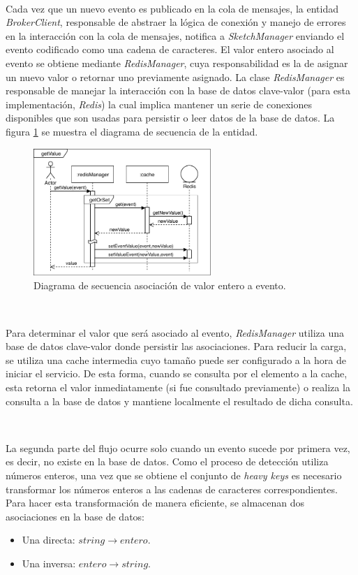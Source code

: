 \documentclass[a4paper,12pt, oneside]{article}
\begin{document}
\

Cada vez que un nuevo evento es publicado en la cola de mensajes, la entidad \textit{BrokerClient}, responsable de abstraer la lógica de conexión y manejo de errores en la interacción con la cola de mensajes, notifica a \textit{SketchManager} enviando el evento codificado como una cadena de caracteres. El valor entero asociado al evento se obtiene mediante \textit{RedisManager}, cuya responsabilidad es la de asignar un nuevo valor o retornar uno previamente asignado. La clase \textit{RedisManager} es responsable de manejar la interacción con la base de datos clave-valor (para esta implementación, \textit{Redis}) la cual implica mantener un serie de conexiones disponibles que son usadas para persistir o leer datos de la base de datos. La figura \ref{diag:redis_manager} se muestra el diagrama de secuencia de la entidad.

\begin{figure}[hb]
	\centering
	\includegraphics[width=0.6\textwidth]{./graph/SecDiag-redisManagerGetValue.pdf}
	\caption{Diagrama de secuencia asociación de valor entero a evento.}
	\label{diag:redis_manager}
\end{figure}

\

Para determinar el valor que será asociado al evento, \textit{RedisManager} utiliza una base de datos clave-valor donde persistir las asociaciones. Para reducir la carga, se utiliza una cache intermedia cuyo tamaño puede ser configurado a la hora de iniciar el servicio. De esta forma, cuando se consulta por el elemento a la cache, esta retorna el valor inmediatamente (si fue consultado previamente) o realiza la consulta a la base de datos y mantiene localmente el resultado de dicha consulta. 

\

La segunda parte del flujo ocurre solo cuando un evento sucede por primera vez, es decir, no existe en la base de datos. Como el proceso de detección utiliza números enteros, una vez que se obtiene el conjunto de \textit{heavy keys} es necesario transformar los números enteros a las cadenas de caracteres correspondientes. Para hacer esta transformación de manera eficiente, se almacenan dos asociaciones en la base de datos:
\begin{itemize}
	\item Una directa: $string \rightarrow entero$.
	\item Una inversa: $entero \rightarrow string$.
\end{itemize}
\end{document}
